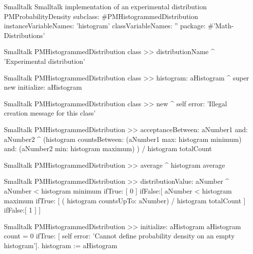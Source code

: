 %
\begin{listing}[label=lst:histprob]{Smalltalk}
{Smalltalk implementation of an experimental distribution}
PMProbabilityDensity subclass: #PMHistogrammedDistribution
   instanceVariableNames: 'histogram'
    classVariableNames: ''
    package: #'Math-Distributions'
\end{listing}

\begin{displaycode}{Smalltalk}
PMHistogrammedDistribution class >> distributionName
    ^ 'Experimental distribution'
\end{displaycode}

\begin{displaycode}{Smalltalk}
PMHistogrammedDistribution class >> histogram: aHistogram
    ^ super new initialize: aHistogram
\end{displaycode}

\begin{displaycode}{Smalltalk}
PMHistogrammedDistribution class >> new
    ^ self error: 'Illegal creation message for this class'
\end{displaycode}

\begin{displaycode}{Smalltalk}
PMHistogrammedDistribution >> acceptanceBetween: aNumber1 and: aNumber2
    ^ (histogram countsBetween: (aNumber1 max: histogram minimum)
                        and: (aNumber2 min: histogram maximum) ) / 
                                                  histogram totalCount
\end{displaycode}

\begin{displaycode}{Smalltalk}
PMHistogrammedDistribution >> average
    ^ histogram average
\end{displaycode}

\begin{displaycode}{Smalltalk}
PMHistogrammedDistribution >> distributionValue: aNumber
    ^ aNumber < histogram minimum
        ifTrue: [ 0 ]
        ifFalse:[ aNumber < histogram maximum
                            ifTrue: [ ( histogram countsUpTo: 
                                      aNumber) / histogram totalCount ]
                            ifFalse:[ 1 ]
                    ]
\end{displaycode}

\begin{displaycode}{Smalltalk}
PMHistogrammedDistribution >> initialize: aHistogram
    aHistogram count = 0
        ifTrue: [ self error: 'Cannot define probability density on 
                                                 an empty histogram'].
    histogram := aHistogram
\end{displaycode}

